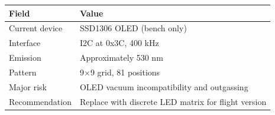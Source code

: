\begin{longtable}{L{4cm}Y}
\toprule
\textbf{Field} & \textbf{Value} \\
\midrule
Current device & SSD1306 OLED (bench only) \\
Interface & I2C at 0x3C, 400 kHz \\
Emission & Approximately 530 nm \\
Pattern & 9$\times$9 grid, 81 positions \\
Major risk & OLED vacuum incompatibility and outgassing \\
Recommendation & Replace with discrete LED matrix for flight version \\
\bottomrule
\end{longtable}

